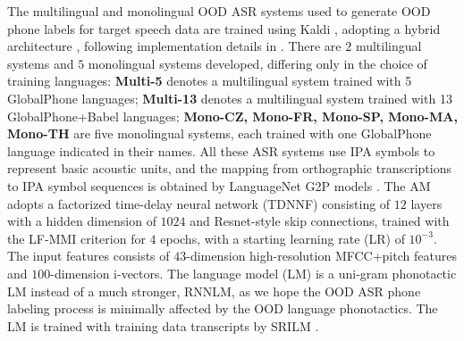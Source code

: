 \documentclass[a4paper]{article}
\begin{document}
The multilingual and monolingual OOD ASR systems used to generate OOD phone labels for target speech data are trained using Kaldi \cite{povey2011kaldi}, adopting a hybrid  architecture \cite{dahl2011context}, following implementation details in \cite{feng2021how}. There are  $2$ multilingual systems and $5$ monolingual systems developed, differing  only in the choice  of   training   languages: \textbf{Multi-5} denotes a multilingual system trained with 5 GlobalPhone languages; \textbf{Multi-13} denotes a multilingual system trained with 13 GlobalPhone+Babel languages; \textbf{Mono-CZ, Mono-FR, Mono-SP, Mono-MA, Mono-TH} are five monolingual systems, each trained with one GlobalPhone language   indicated in their names. All these ASR systems use IPA symbols to represent basic acoustic units, and the mapping from  orthographic transcriptions  to IPA symbol sequences is obtained by LanguageNet G2P models \cite{hasegawa2020grapheme}. The AM adopts a factorized time-delay neural network (TDNNF) consisting of $12$ layers with a hidden dimension of $1024$
and Resnet-style skip connections, trained with the LF-MMI criterion \cite{povey2016purely} for $4$ epochs, with a starting learning rate (LR) of $10^{-3}$. The input features consists of $43$-dimension high-resolution MFCC+pitch features and $100$-dimension i-vectors. The language model (LM) is a uni-gram phonotactic LM instead of a much stronger, RNNLM, as we hope the OOD ASR phone labeling process is minimally affected by the OOD language phonotactics. The LM is trained with training data transcripts by SRILM \cite{Stolcke02srilm--}.

\end{document}
